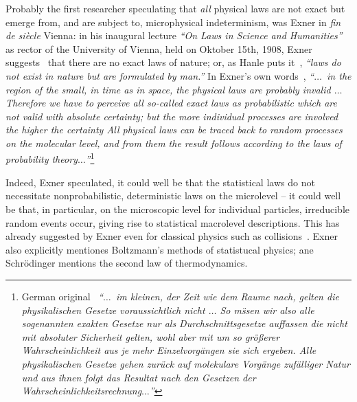 Probably the first researcher speculating that {\em all} physical laws are not exact but emerge from, and
are subject to, microphysical indeterminism, was Exner
in {\it fin de si\`ecle} Vienna: in his
inaugural lecture {\em ``On Laws in Science and Humanities''} as rector of the University of
Vienna, held on Oktober 15th, 1908, Exner suggests~\cite[p.~18]{Exner-1908}
that there are no exact laws of nature; or, as Hanle puts it~\cite{Hanley-1979},
{\em ``laws do not exist in nature but are formulated by man.''}
In Exner's own words~\cite{Exner-1908},
{\em ``$\ldots$~in the region of the small, in time as in space, the physical
laws are probably invalid
$\ldots$
Therefore we have to perceive all so-called exact laws  as probabilistic which are not valid with absolute certainty;
but the more individual processes are involved the higher the certainty
All physical laws can be traced back to random processes on the  molecular level,
and from them the result follows according to the laws of probability theory$\ldots$''}\footnote{
German original~\cite{Exner-1908}
{\em ``$\ldots$~im kleinen, der Zeit wie dem Raume nach,
gelten die physikalischen Gesetze voraussichtlich nicht
$\ldots$
So m\"ssen wir also alle sogenannten exakten Gesetze
nur als Durchschnittsgesetze auffassen die nicht
mit absoluter Sicherheit gelten, wohl aber mit um so
gr\"o{\ss}erer Wahrscheinlichkeit aus je mehr Einzelvorg\"angen
sie sich ergeben. Alle physikalischen Gesetze
gehen zur\"uck auf molekulare Vorg\"ange zuf\"alliger Natur
und aus ihnen folgt das Resultat nach den Gesetzen
der Wahrscheinlichkeitsrechnung$\ldots$''}}

Indeed, Exner speculated, it could well be that the statistical laws do not necessitate nonprobabilistic,
deterministic laws on the microlevel -- it could well be that, in particular, on the microscopic level for individual particles,
irreducible random events occur, giving rise to statistical macrolevel descriptions.
This has already suggested by Exner even for classical physics such as collisions~\cite{Exner-1908}.
Exner also explicitly mentiones Boltzmann's methods of statistucal physics;
ane Schr\"odinger mentions the second law of thermodynamics.



